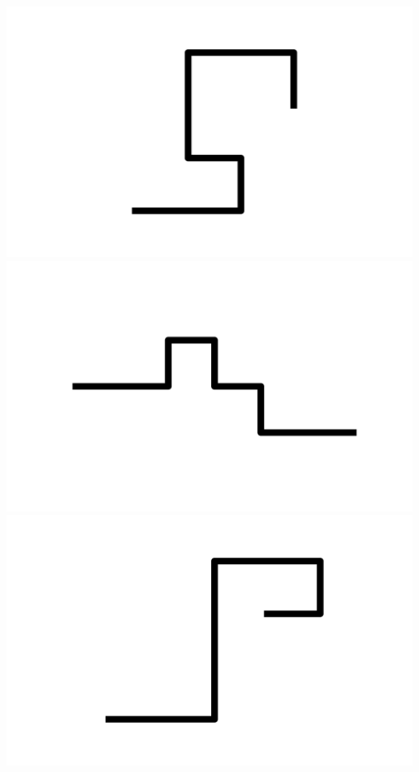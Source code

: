 \documentclass[]{report}
\begin{document}
\includegraphics[scale=.1]{pictures/21/state_cluster_shapes_220.pdf} 
\includegraphics[scale=.1]{pictures/21/state_cluster_shapes_221.pdf} 
\includegraphics[scale=.1]{pictures/21/state_cluster_shapes_222.pdf} 
\end{document}
